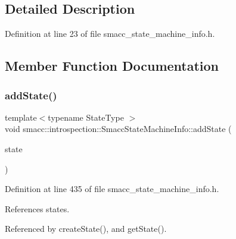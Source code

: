 \subsection{Detailed Description}


Definition at line 23 of file smacc\+\_\+state\+\_\+machine\+\_\+info.\+h.



\subsection{Member Function Documentation}
\mbox{\label{classsmacc_1_1introspection_1_1SmaccStateMachineInfo_ab4eafccfbba21257405fc4274c2ed22a}} 
\subsubsection{\texorpdfstring{add\+State()}{addState()}}
{\footnotesize\ttfamily template$<$typename State\+Type $>$ \\
void smacc\+::introspection\+::\+Smacc\+State\+Machine\+Info\+::add\+State (\begin{DoxyParamCaption}\item[{std\+::shared\+\_\+ptr$<$ State\+Type $>$ \&}]{state }\end{DoxyParamCaption})}



Definition at line 435 of file smacc\+\_\+state\+\_\+machine\+\_\+info.\+h.



References states.



Referenced by create\+State(), and get\+State().



